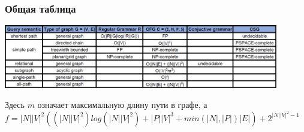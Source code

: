\documentclass{beamer}
\begin{document}
\begin{frame}[fragile]
	\transwipe[direction=90]
	\frametitle{Общая таблица}
	\begin{center}
	            \includegraphics[width=340pt]{pictures/table_short.png}
	\end{center}
	Здесь $m$ означает максимальную длину пути в графе, а $f = |N||V|^{2}((|N||V|^{2}) log(|N||V|^{2}) + |P||V|^{3} + min(|N|,|P|) |E|) + 2^{|N||V|^{2} - 1}$
\end{frame}
\end{document}
